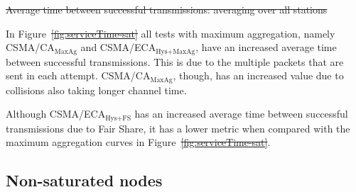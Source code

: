 \documentclass[a4paper,journal]{IEEEtran}
\providecommand{\DIFaddtex}[1]{{\protect\color{blue}\uwave{#1}}} %
\providecommand{\DIFdeltex}[1]{{\protect\color{red}\sout{#1}}}                      %
\providecommand{\DIFaddbegin}{} %
\providecommand{\DIFaddend}{} %
\providecommand{\DIFdelbegin}{} %
\providecommand{\DIFdelend}{} %
\providecommand{\DIFdelFL}[1]{\DIFdel{#1}} %
\providecommand{\DIFadd}[1]{\texorpdfstring{\DIFaddtex{#1}}{#1}} %
\providecommand{\DIFdel}[1]{\texorpdfstring{\DIFdeltex{#1}}{}} %
\begin{document}
\DIFdelbegin %
{%
\DIFdelFL{Average time between successful transmissions: averaging over all stations}}
\DIFdelend %

	In Figure~\DIFdelbegin \DIFdel{\ref{fig:serviceTime-sat} }\DIFdelend \DIFaddbegin \DIFadd{\ref{fig:satResults}d }\DIFaddend all tests with maximum aggregation, namely CSMA/CA$_{\text{MaxAg}}$ and CSMA/ECA$_{\text{Hys+MaxAg}}$, have an increased average time between successful transmissions. This is due to the multiple packets that are sent in each attempt. CSMA/CA$_{\text{MaxAg}}$, though, has an increased value due to collisions also taking longer channel time.

	Although CSMA/ECA$_{\text{Hys+FS}}$ has an increased average time between successful transmissions due to Fair Share, it has a lower metric when compared with the maximum aggregation curves in Figure~\DIFdelbegin \DIFdel{\ref{fig:serviceTime-sat}}\DIFdelend \DIFaddbegin \DIFadd{\ref{fig:satResults}d}\DIFaddend .


\DIFaddbegin 


	\DIFaddend \subsection{Non-saturated nodes}\label{resultsUnsaturated}
	\DIFaddbegin 
\end{document}
